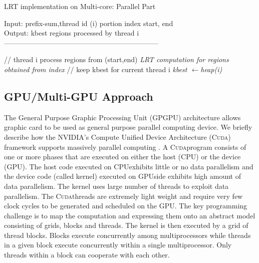 \documentclass[AMA,LATO1COL]{WileyNJD-v2}
\newcommand{\gpu}{\textsc{GPU}}
\newcommand{\cpu}{\textsc{CPU}}
\newcommand{\cuda}{\textsc{Cuda}}
\begin{document}
\begin{algorithm}[t!]
\caption{LRT implementation on Multi-core: Parallel Part}\label{multicorep}
Input: prefix-sum,thread id (i) portion index start, end\\
Output: kbest regions processed by thread i\\
------------------------------------------------------------------ \\
\begin{algorithmic}[1]
 \State // thread i process regions from (start,end)
\State \textit {LRT computation for regions obtained from index}
\State // keep kbest for current thread i
\State \textit {kbest \(\leftarrow\)heap(i)}
\EndFor
\end{algorithmic}
\end{algorithm}




\subsection{GPU/Multi-GPU Approach}
The General Purpose Graphic Processing Unit (GPGPU) architecture
allows graphic card to be used as general purpose parallel computing
device.  We briefly describe how the NVIDIA's Compute Unified Device Architecture (\cuda) framework supports massively parallel computing \cite{cuda}. A \cuda program consists of one or more phases that are executed on either the host (\cpu) or the device (\gpu). The host code executed on \cpu exhibits little or no data parallelism and the device code (called kernel) executed on \gpu side exhibits high amount of data parallelism. The kernel uses large number of threads to exploit data parallelism. The \cuda threads are
extremely light weight and require very few clock cycles to be generated and scheduled on the \gpu. The key programming challenge is to map the computation and expressing them onto an abstract model consisting of grids, blocks and threads. The kernel is then executed by a grid of thread blocks. Blocks execute concurrently among multiprocessors while threads in a given block execute concurrently within a single multiprocessor. Only threads within a block can cooperate with each other.
\end{document}

